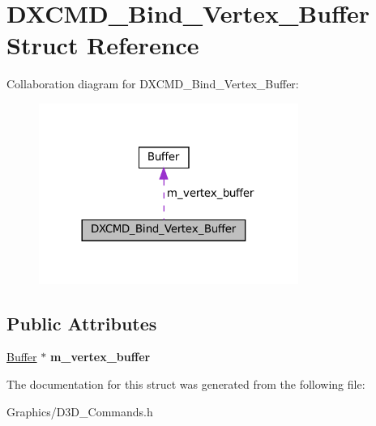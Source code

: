 \hypertarget{structDXCMD__Bind__Vertex__Buffer}{}\section{D\+X\+C\+M\+D\+\_\+\+Bind\+\_\+\+Vertex\+\_\+\+Buffer Struct Reference}
\label{structDXCMD__Bind__Vertex__Buffer}


Collaboration diagram for D\+X\+C\+M\+D\+\_\+\+Bind\+\_\+\+Vertex\+\_\+\+Buffer\+:\nopagebreak
\begin{figure}[H]
\begin{center}
\leavevmode
\includegraphics[width=240pt]{structDXCMD__Bind__Vertex__Buffer__coll__graph}
\end{center}
\end{figure}
\subsection*{Public Attributes}
\begin{DoxyCompactItemize}
\item 
\mbox{\label{structDXCMD__Bind__Vertex__Buffer_ada6d4b918d2d7fad1bfdbb94bb8064f4}} 
\hyperlink{classBuffer}{Buffer} $\ast$ {\bfseries m\+\_\+vertex\+\_\+buffer}
\end{DoxyCompactItemize}


The documentation for this struct was generated from the following file\+:\begin{DoxyCompactItemize}
\item 
Graphics/D3\+D\+\_\+\+Commands.\+h\end{DoxyCompactItemize}
